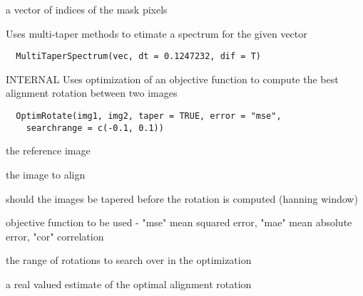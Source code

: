 \documentclass[a4paper]{book}
\begin{document}
%
\begin{Value}
a vector of indices of the mask pixels
\end{Value}
%
\begin{Description}\relax
Uses multi-taper methods to etimate a spectrum for the
given vector
\end{Description}
%
\begin{Usage}
\begin{verbatim}
  MultiTaperSpectrum(vec, dt = 0.1247232, dif = T)
\end{verbatim}
\end{Usage}
%
\begin{Description}\relax
INTERNAL Uses optimization of an objective function to
compute the best alignment rotation between two images
\end{Description}
%
\begin{Usage}
\begin{verbatim}
  OptimRotate(img1, img2, taper = TRUE, error = "mse",
    searchrange = c(-0.1, 0.1))
\end{verbatim}
\end{Usage}
%
\begin{Arguments}
\begin{ldescription}
\item[\code{img1}] the reference image

\item[\code{img2}] the image to align

\item[\code{taper}] should the images be tapered before the
rotation is computed (hanning window)

\item[\code{error}] objective function to be used - "mse" mean
squared error, "mae" mean absolute error, "cor"
correlation

\item[\code{searchrange}] the range of rotations to search over
in the optimization
\end{ldescription}
\end{Arguments}
%
\begin{Value}
a real valued estimate of the optimal alignment rotation
\end{Value}
\end{document}
